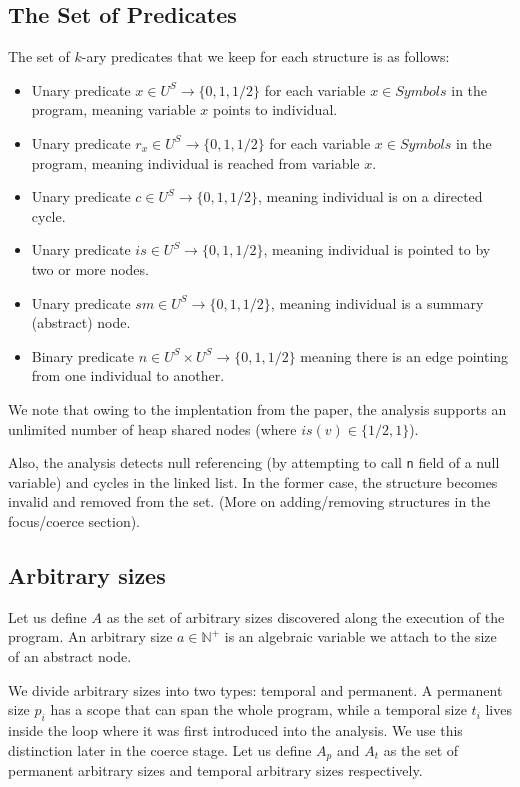 \subsection*{The Set of Predicates}
The set of $k$-ary predicates that we keep for each structure is as follows:
\begin{itemize}
	\item Unary predicate $x\in U^S\to \{0,1,1/2\}$ for each variable $x\in Symbols$ in the program, meaning variable $x$ points to individual.
	\item Unary predicate $r_x\in U^S\to \{0,1,1/2\}$ for each variable $x\in Symbols$ in the program, meaning individual is reached from variable $x$.
	\item Unary predicate $c\in U^S\to \{0,1,1/2\}$, meaning individual is on a directed cycle.
	\item Unary predicate $is\in U^S\to \{0,1,1/2\}$, meaning individual is pointed to by two or more nodes.
	\item Unary predicate $sm\in U^S\to \{0,1,1/2\}$, meaning individual is a summary (abstract) node.
	\item Binary predicate $n\in U^S\times U^S\to \{0,1,1/2\}$ meaning there is an edge pointing from one individual to another.
\end{itemize}
We note that owing to the implentation from the paper, the analysis supports an unlimited number of heap shared nodes (where $is(v)\in\{1/2,1\}$).

Also, the analysis detects null referencing (by attempting to call \texttt{n} field of a null variable) and cycles in the linked list. In the former case, the structure becomes invalid and removed from the set. (More on adding/removing structures in the focus/coerce section). 

\subsection*{Arbitrary sizes}
Let us define $A$ as the set of arbitrary sizes discovered along the execution of the program. An arbitrary size $a\in\mathbb{N}^+$ is an algebraic variable we attach to the size of an abstract node.

We divide arbitrary sizes into two types: temporal and permanent. A permanent size $p_i$ has a scope that can span the whole program, while a temporal size $t_i$ lives inside the loop where it was first introduced into the analysis. We use this distinction later in the coerce stage. Let us define $A_p$ and $A_t$ as the set of permanent arbitrary sizes and temporal arbitrary sizes respectively.

